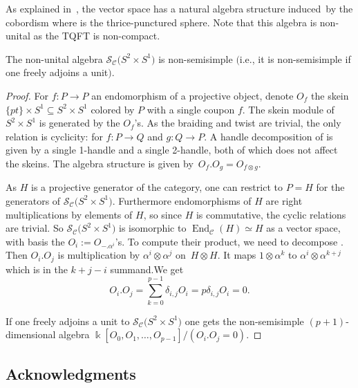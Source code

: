 \documentclass[pdftex]{sigma}
\numberwithin{equation}{section}
\numberwithin{theorem}{section}
\numberwithin{proposition}{section}
\numberwithin{definition}{section}
\numberwithin{lemma}{section}
\numberwithin{corollary}{section}
\numberwithin{remark}{section}
\numberwithin{example}{section}
\newcommand{\cat}{\mathcal{C}}
\newcommand{\End}{\operatorname{End}}
\newcommand{\FK}{{\Bbbk}}
\newcommand{\TSkein}{{\mathscr{S}}}
\begin{document}
As explained in~\cite{Reutter}, the vector space
\smash{$\TSkein_\cat\bigl(S^2\times S^1\bigr)$} has a natural algebra structure induced~by
the cobordism  where
 is the thrice-punctured sphere.
 Note that this
algebra is non-unital as the TQFT is non-compact.
\begin{proposition}
 The non-unital algebra $\TSkein_\cat\bigl(S^2\times S^1\bigr)$ is
 non-semisimple $($i.e., it is non-semisimple if one freely adjoins a
 unit$)$.
\end{proposition}
\begin{proof}
For $f\colon P\to P$ an endomorphism of a projective object, denote $O_f$ the skein $\{pt\}\times S^1\subseteq S^2\times S^1$ colored by $P$ with a single coupon $f$. The skein module of $S^2\times S^1$ is generated by the $O_f$'s. As the braiding and twist are trivial, the only relation is cyclicity:  for $f\colon P\to Q$ and $g\colon Q\to P$. A handle decomposition of  is given by a single 1-handle and a single 2-handle, both of which does not affect the skeins. The algebra structure is given by~${O_f . O_g=O_{f\otimes g}}$.

As $H$ is a projective generator of the category, one can restrict to $P=H$ for the generators of $\TSkein_\cat\bigl(S^2\times S^1\bigr)$. Furthermore endomorphisms of $H$ are right multiplications by elements of $H$, so since $H$ is commutative, the cyclic relations are trivial. So $\TSkein_\cat\bigl(S^2\times S^1\bigr)$ is isomorphic to $\End_\cat(H)\simeq H$ as a vector space, with basis the $O_i:=O_{-.\alpha^i}$'s.
To compute their product, we need to decompose .
Then $O_i. O_j$
is multiplication by $\alpha^i\otimes \alpha^j$ on~${H\otimes H}$. It maps $1\otimes\alpha^k$ to $\alpha^i\otimes\alpha^{k+j}$ which is in the $k+j-i$ summand.We get
\[
O_i. O_j = \sum_{k=0}^{p-1} \delta_{i,j}O_i = p\delta_{i,j}O_i = 0.\]

If one freely adjoins a unit to $\TSkein_\cat\bigl(S^2\times S^1\bigr)$ one gets the non-semisimple $(p+1)$-dimensional algebra $\FK[O_0,O_1,\dots,O_{p-1}]/(O_i.O_j=0)$.
\end{proof}

\subsection*{Acknowledgments}
\end{document}
